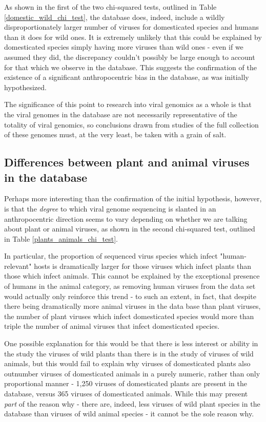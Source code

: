 \documentclass[12pt]{article}
\begin{document}
    As shown in the first of the two chi-squared tests, outlined in Table
    \ref{domestic_wild_chi_test}, the database does, indeed, include a wildly
    disproportionately larger number of viruses for domesticated species and
    humans than it does for wild ones. It is extremely unlikely that this could
    be explained by domesticated species simply having more viruses than wild
    ones - even if we assumed they did, the discrepancy couldn't possibly be
    large enough to account for that which we observe in the database. This suggests
    the confirmation of the existence of a significant anthropocentric bias
    in the database, as was initially hypothesized.

    The significance of this point to research into viral genomics as a whole is
    that the viral genomes in the database are not necessarily representative of
    the totality of viral genomics, so conclusions drawn from studies of the full
    collection of these genomes must, at the very least, be taken with a grain of
    salt.

    \subsection{Differences between plant and animal viruses in the database}

    Perhaps more interesting than the confirmation of the initial hypothesis,
    however, is that the \emph{degree} to which viral genome sequencing is slanted in
    an anthropocentric direction seems to vary depending on whether we are
    talking about plant or animal viruses, as shown in the second chi-squared
    test, outlined in Table \ref{plants_animals_chi_test}.

    In particular, the proportion of sequenced virus species which infect 
    "human-relevant" hosts is dramatically larger for those viruses which infect
    plants than those which infect animals. This cannot be explained by the
    exceptional presence of humans in the animal category, as removing
    human viruses from the data set would actually only reinforce this trend
    - to such an extent, in fact, that despite there being dramatically more
    animal viruses in the data base than plant viruses, the number of plant
    viruses which infect domesticated species would more than triple the number
    of animal viruses that infect domesticated species.

    One possible explanation for this would be that there is less interest or
    ability in the study the viruses of wild plants than there is in the study
    of viruses of wild animals, but this would fail to explain why viruses
    of domesticated plants also outnumber viruses of domesticated animals in a
    purely numeric, rather than only proportional manner - 1,250 viruses of
    domesticated plants are present in the database, versus 365 viruses of
    domesticated animals. While this may present \emph{part} of the reason
    why - there are, indeed, less viruses of wild plant species in the database
    than viruses of wild animal species - it cannot be the sole reason why.
\end{document}
